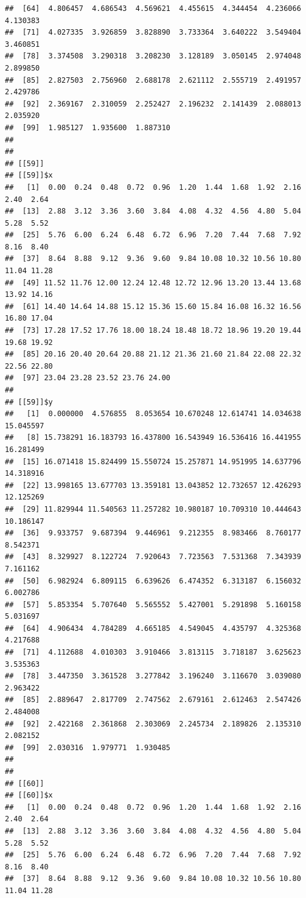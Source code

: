 \documentclass[
  ignorenonframetext,
]{beamer}
\begin{document}
\begin{frame}[fragile]{}
\begin{verbatim}
##  [64]  4.806457  4.686543  4.569621  4.455615  4.344454  4.236066  4.130383
##  [71]  4.027335  3.926859  3.828890  3.733364  3.640222  3.549404  3.460851
##  [78]  3.374508  3.290318  3.208230  3.128189  3.050145  2.974048  2.899850
##  [85]  2.827503  2.756960  2.688178  2.621112  2.555719  2.491957  2.429786
##  [92]  2.369167  2.310059  2.252427  2.196232  2.141439  2.088013  2.035920
##  [99]  1.985127  1.935600  1.887310
## 
## 
## [[59]]
## [[59]]$x
##   [1]  0.00  0.24  0.48  0.72  0.96  1.20  1.44  1.68  1.92  2.16  2.40  2.64
##  [13]  2.88  3.12  3.36  3.60  3.84  4.08  4.32  4.56  4.80  5.04  5.28  5.52
##  [25]  5.76  6.00  6.24  6.48  6.72  6.96  7.20  7.44  7.68  7.92  8.16  8.40
##  [37]  8.64  8.88  9.12  9.36  9.60  9.84 10.08 10.32 10.56 10.80 11.04 11.28
##  [49] 11.52 11.76 12.00 12.24 12.48 12.72 12.96 13.20 13.44 13.68 13.92 14.16
##  [61] 14.40 14.64 14.88 15.12 15.36 15.60 15.84 16.08 16.32 16.56 16.80 17.04
##  [73] 17.28 17.52 17.76 18.00 18.24 18.48 18.72 18.96 19.20 19.44 19.68 19.92
##  [85] 20.16 20.40 20.64 20.88 21.12 21.36 21.60 21.84 22.08 22.32 22.56 22.80
##  [97] 23.04 23.28 23.52 23.76 24.00
## 
## [[59]]$y
##   [1]  0.000000  4.576855  8.053654 10.670248 12.614741 14.034638 15.045597
##   [8] 15.738291 16.183793 16.437800 16.543949 16.536416 16.441955 16.281499
##  [15] 16.071418 15.824499 15.550724 15.257871 14.951995 14.637796 14.318916
##  [22] 13.998165 13.677703 13.359181 13.043852 12.732657 12.426293 12.125269
##  [29] 11.829944 11.540563 11.257282 10.980187 10.709310 10.444643 10.186147
##  [36]  9.933757  9.687394  9.446961  9.212355  8.983466  8.760177  8.542371
##  [43]  8.329927  8.122724  7.920643  7.723563  7.531368  7.343939  7.161162
##  [50]  6.982924  6.809115  6.639626  6.474352  6.313187  6.156032  6.002786
##  [57]  5.853354  5.707640  5.565552  5.427001  5.291898  5.160158  5.031697
##  [64]  4.906434  4.784289  4.665185  4.549045  4.435797  4.325368  4.217688
##  [71]  4.112688  4.010303  3.910466  3.813115  3.718187  3.625623  3.535363
##  [78]  3.447350  3.361528  3.277842  3.196240  3.116670  3.039080  2.963422
##  [85]  2.889647  2.817709  2.747562  2.679161  2.612463  2.547426  2.484008
##  [92]  2.422168  2.361868  2.303069  2.245734  2.189826  2.135310  2.082152
##  [99]  2.030316  1.979771  1.930485
## 
## 
## [[60]]
## [[60]]$x
##   [1]  0.00  0.24  0.48  0.72  0.96  1.20  1.44  1.68  1.92  2.16  2.40  2.64
##  [13]  2.88  3.12  3.36  3.60  3.84  4.08  4.32  4.56  4.80  5.04  5.28  5.52
##  [25]  5.76  6.00  6.24  6.48  6.72  6.96  7.20  7.44  7.68  7.92  8.16  8.40
##  [37]  8.64  8.88  9.12  9.36  9.60  9.84 10.08 10.32 10.56 10.80 11.04 11.28

\end{verbatim}
\end{frame}
\end{document}
